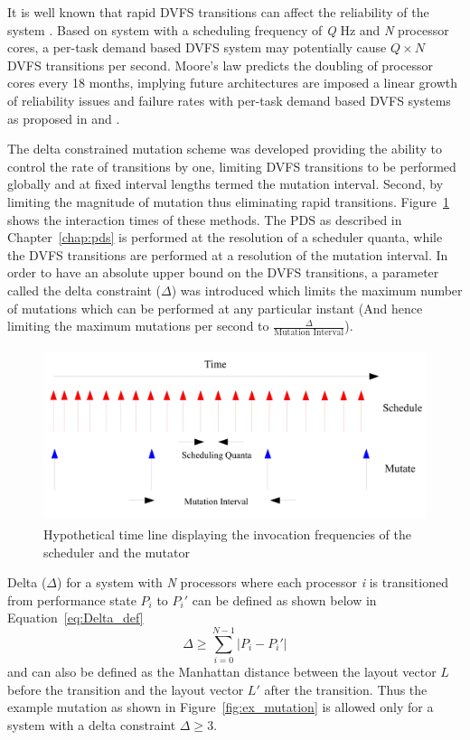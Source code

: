 It is well known that rapid DVFS transitions can affect the reliability of the system \cite{ImpactDVFS}.
Based on system with a scheduling frequency of \textit{Q} Hz
and \textit{N} processor cores, a per-task demand based DVFS system may potentially cause $Q \times N$ 
DVFS transitions per second. Moore's law predicts the doubling of processor cores every 18 months, implying
future architectures are imposed a linear growth of reliability issues and failure rates with per-task
demand based DVFS systems as proposed in \cite{LiveRuntime} and \cite{Phaseaware}. 

The delta constrained mutation scheme was developed providing the ability to control the rate of transitions
by one, limiting DVFS transitions to be performed globally and at fixed interval lengths termed the mutation
interval. Second, by limiting the magnitude of mutation thus eliminating rapid transitions.
Figure~\ref{fig:schedule_mutate} shows the interaction times of these methods. 
The PDS as described in Chapter~\ref{chap:pds} is performed at the resolution of a scheduler quanta, while
the DVFS transitions are performed at a resolution of the mutation interval. In order to have an absolute
upper bound on the DVFS transitions, a parameter called the delta constraint ($\Delta$) was introduced
which limits the maximum number of mutations which can be performed at any particular instant (And hence
limiting the maximum mutations per second to $\frac{\Delta}{\text{Mutation Interval}}$). 

\begin{figure}[h!]
  \begin{center}
    \includegraphics[height=2in]{figures/Schedule_Mutate.jpg}
    \caption{Hypothetical time line displaying the invocation frequencies of the scheduler and the mutator}
    \label{fig:schedule_mutate}
  \end{center}
\end{figure}


Delta ($\Delta$) for a system with \textit{N} processors where each processor \textit{i} is transitioned
from performance state $P_{i}$ to $P_{i}'$ can be defined as shown below in Equation~\eqref{eq:Delta_def}
\begin{equation}
    \Delta \geq \displaystyle\sum_{i=0}^{N-1} {| P_{i} - P_{i}' |}
\label{eq:Delta_def}
\end{equation}
and can also be defined as the Manhattan distance between the layout vector $L$ before the transition and 
the layout vector $L'$ after the transition. Thus the example mutation as shown in Figure~\ref{fig:ex_mutation}
is allowed only for a system with a delta constraint $\Delta \geq 3$. 

